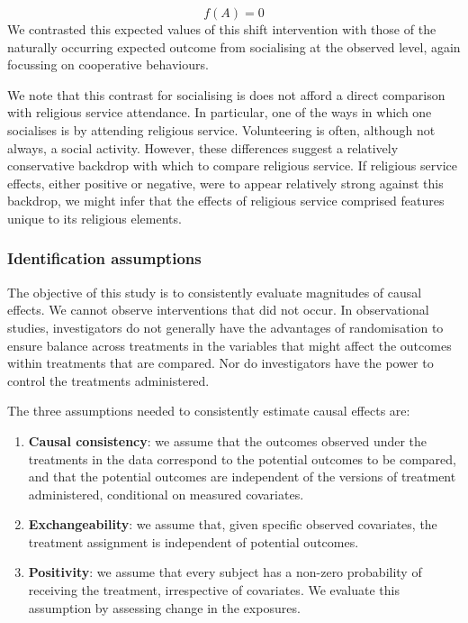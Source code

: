 \documentclass[
  singlecolumn]{article}
\begin{document}
\[f(A) = 0 \] We contrasted this expected values of this shift
intervention with those of the naturally occurring expected outcome from
socialising at the observed level, again focussing on cooperative
behaviours.

We note that this contrast for socialising is does not afford a direct
comparison with religious service attendance. In particular, one of the
ways in which one socialises is by attending religious service.
Volunteering is often, although not always, a social activity. However,
these differences suggest a relatively conservative backdrop with which
to compare religious service. If religious service effects, either
positive or negative, were to appear relatively strong against this
backdrop, we might infer that the effects of religious service comprised
features unique to its religious elements.

\subsubsection{Identification
assumptions}\label{identification-assumptions}

The objective of this study is to consistently evaluate magnitudes of
causal effects. We cannot observe interventions that did not occur. In
observational studies, investigators do not generally have the
advantages of randomisation to ensure balance across treatments in the
variables that might affect the outcomes within treatments that are
compared. Nor do investigators have the power to control the treatments
administered.

The three assumptions needed to consistently estimate causal effects
are:

\begin{enumerate}
\def\labelenumi{\arabic{enumi}.}
\item
  \textbf{Causal consistency}: we assume that the outcomes observed
  under the treatments in the data correspond to the potential outcomes
  to be compared, and that the potential outcomes are independent of the
  versions of treatment administered, conditional on measured
  covariates.
\item
  \textbf{Exchangeability}: we assume that, given specific observed
  covariates, the treatment assignment is independent of potential
  outcomes.
\item
  \textbf{Positivity}: we assume that every subject has a non-zero
  probability of receiving the treatment, irrespective of covariates. We
  evaluate this assumption by assessing change in the exposures.
\end{enumerate}
\end{document}
